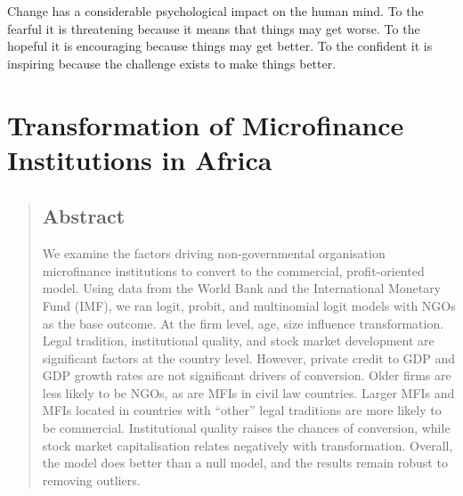 \documentclass[a4paper,nobind]{templates/ociamthesis}
\begin{document}
\setlength{\textbaselineskip}{22pt plus2pt}

\setlength{\parskip}{2pt plus 1pt}

\setlength{\baselineskip}{\textbaselineskip}

\begin{savequote}
Change has a considerable psychological impact on the human mind. To the
fearful it is threatening because it means that things may get worse. To
the hopeful it is encouraging because things may get better. To the
confident it is inspiring because the challenge exists to make things
better.
\end{savequote}



\hypertarget{transformation-of-microfinance-institutions-in-africa}{%
\chapter{Transformation of Microfinance Institutions in Africa}\label{transformation-of-microfinance-institutions-in-africa}}

\minitoc 

\newpage

\begin{quote}
\hypertarget{abstract}{%
\section{\texorpdfstring{\textbf{Abstract}}{Abstract}}\label{abstract}}

We examine the factors driving non-governmental organisation microfinance institutions to convert to the commercial, profit-oriented model. Using data from the World Bank and the International Monetary Fund (IMF), we ran logit, probit, and multinomial logit models with NGOs as the base outcome. At the firm level, age, size influence transformation. Legal tradition, institutional quality, and stock market development are significant factors at the country level. However, private credit to GDP and GDP growth rates are not significant drivers of conversion. Older firms are less likely to be NGOs, as are MFIs in civil law countries. Larger MFIs and MFIs located in countries with ``other'' legal traditions are more likely to be commercial. Institutional quality raises the chances of conversion, while stock market capitalisation relates negatively with transformation. Overall, the model does better than a null model, and the results remain robust to removing outliers.
\end{quote}
\end{document}
